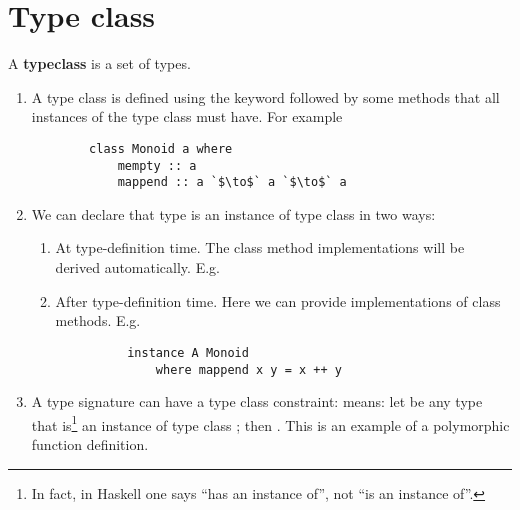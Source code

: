 \documentclass[12pt]{article}
\begin{document}
\section{Type class}
\begin{definition*}
  A {\bf typeclass} is a set of types.
\end{definition*}

\begin{remark*}\hspace{0pt}
  \begin{enumerate}
  \item A type class is defined using the  keyword followed by some methods that all
    instances of the type class must have. For example
    \begin{normalfont}
      \begin{verbatim}
        class Monoid a where
            mempty :: a
            mappend :: a `$\to$` a `$\to$` a
      \end{verbatim}
    \end{normalfont}
  \item We can declare that type  is an instance of type class  in two ways:
    \begin{enumerate}
    \item At type-definition time. The class method implementations will be derived
      automatically. E.g. 
    \item After type-definition time. Here we can provide implementations of class methods. E.g.
      \begin{normalfont}
        \begin{verbatim}
          instance A Monoid
              where mappend x y = x ++ y
        \end{verbatim}
      \end{normalfont}
    \end{enumerate}
  \item A type signature can have a type class constraint:  means: let
     be any type that is\footnote{In fact, in Haskell one says ``has an instance of'', not
      ``is an instance of''.} an instance of type class ; then . This is an
    example of a polymorphic function definition.
  \end{enumerate}
\end{remark*}
\end{document}
